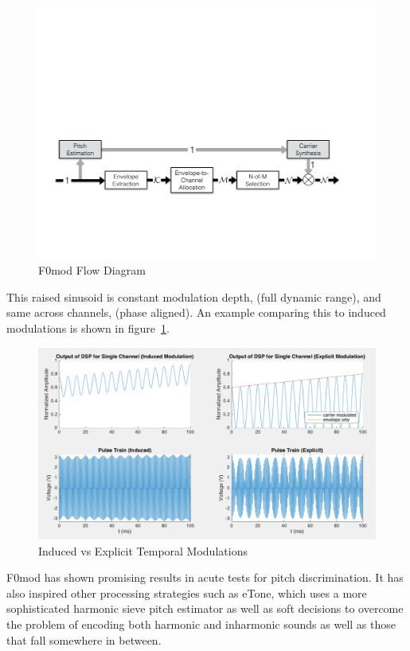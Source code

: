 \documentclass [11pt, proquest,oneside] {ganter_thesis}[2015/03/03]
\begin{document}
\begin{figure}[!ht]
  \centering
    \includegraphics[width=1\textwidth]{F0mod_flow_diagram}   
    \caption{F0mod Flow Diagram}
\end{figure}

This raised sinusoid is constant modulation depth, (full dynamic range), and same across channels, (phase aligned).  An example comparing this to induced modulations is shown in figure~\ref{fig:induced_vs_explicit}.


\begin{figure}[!ht]
  \centering
    \includegraphics[width=1\textwidth]{induced_vs_explicit}   
    \caption{Induced vs Explicit Temporal Modulations}\label{fig:induced_vs_explicit}
\end{figure}

F0mod has shown promising results in acute tests for pitch discrimination.  It has also inspired other processing strategies such as eTone, which uses a more sophisticated harmonic sieve pitch estimator as well as soft decisions to overcome the problem of encoding both harmonic and inharmonic sounds as well as those that fall somewhere in between.
\end{document}
